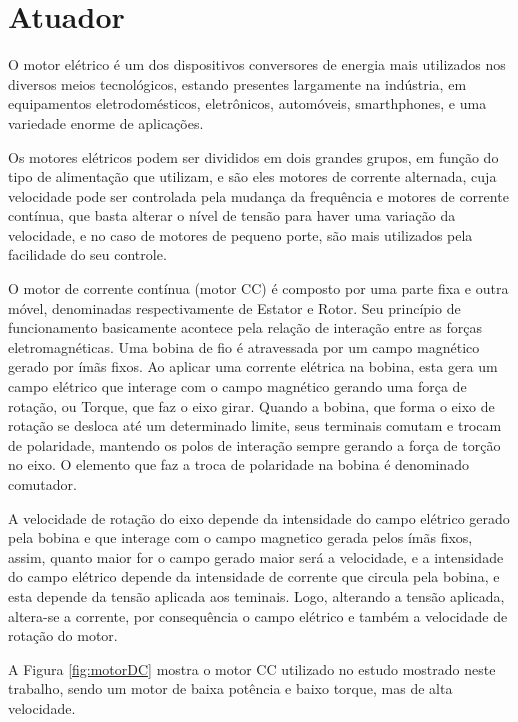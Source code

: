 


\section{Atuador}

O motor elétrico é um dos dispositivos conversores de energia mais utilizados nos diversos meios tecnológicos, estando presentes largamente na indústria, em equipamentos eletrodomésticos, eletrônicos, automóveis, smarthphones, e uma variedade enorme de aplicações. 

Os motores elétricos podem ser divididos em dois grandes grupos, em função do tipo de alimentação que utilizam, e são eles motores de corrente alternada, cuja velocidade pode ser controlada pela mudança da frequência e motores de corrente contínua, que basta alterar o nível de tensão para haver uma variação da velocidade, e no caso de motores de pequeno porte, são mais utilizados pela facilidade do seu controle. 

O motor de corrente contínua (motor CC) é composto por uma parte fixa e outra móvel, denominadas respectivamente de Estator e Rotor. Seu princípio de funcionamento basicamente acontece pela relação de interação entre as forças eletromagnéticas. Uma bobina de fio é atravessada por um campo magnético gerado por ímãs fixos. Ao aplicar uma corrente elétrica na bobina, esta gera um campo elétrico que interage com o campo magnético gerando uma força de rotação, ou Torque, que faz o eixo girar. Quando a bobina, que forma o eixo de rotação se desloca até um determinado limite, seus terminais comutam e trocam de polaridade, mantendo os polos de interação sempre gerando a força de torção no eixo. O elemento que faz a troca de polaridade na bobina é denominado comutador.

A velocidade de rotação do eixo depende da intensidade do campo elétrico gerado pela bobina e que interage com o campo magnetico gerada pelos ímãs fixos, assim, quanto maior for o campo gerado maior será a velocidade, e a intensidade do campo elétrico depende da intensidade de corrente que circula pela bobina, e esta depende da tensão aplicada aos teminais. Logo, alterando a tensão aplicada, altera-se a corrente, por consequência o campo elétrico e também a velocidade de rotação do motor.

A Figura  \ref{fig:motorDC} mostra o motor CC utilizado no estudo mostrado neste trabalho, sendo um motor de baixa potência e baixo torque, mas de alta velocidade. 


